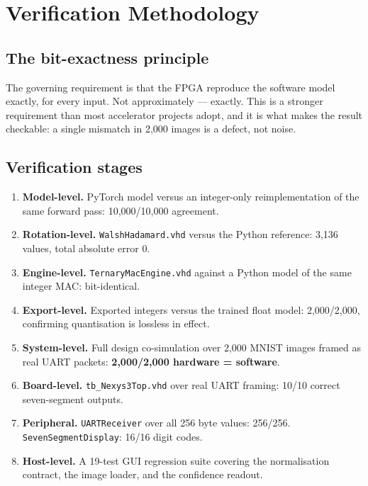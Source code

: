 \documentclass[11pt,a4paper]{article}
\begin{document}
\section{Verification Methodology}
\label{sec:verification}

\subsection{The bit-exactness principle}

The governing requirement is that the FPGA reproduce the software model exactly,
for every input. Not approximately --- exactly. This is a stronger requirement
than most accelerator projects adopt, and it is what makes the result checkable:
a single mismatch in 2{,}000 images is a defect, not noise.

\subsection{Verification stages}

\begin{enumerate}[leftmargin=*]
\item \textbf{Model-level.} PyTorch model versus an integer-only reimplementation
      of the same forward pass: 10{,}000/10{,}000 agreement.
\item \textbf{Rotation-level.} \texttt{WalshHadamard.vhd} versus the Python
      reference: 3{,}136 values, total absolute error 0.
\item \textbf{Engine-level.} \texttt{TernaryMacEngine.vhd} against a Python
      model of the same integer MAC: bit-identical.
\item \textbf{Export-level.} Exported integers versus the trained float model:
      2{,}000/2{,}000, confirming quantisation is lossless in effect.
\item \textbf{System-level.} Full design co-simulation over 2{,}000 MNIST images
      framed as real UART packets: \textbf{2{,}000/2{,}000 hardware = software}.
\item \textbf{Board-level.} \texttt{tb\_Nexys3Top.vhd} over real UART framing:
      10/10 correct seven-segment outputs.
\item \textbf{Peripheral.} \texttt{UARTReceiver} over all 256 byte values:
      256/256. \texttt{SevenSegmentDisplay}: 16/16 digit codes.
\item \textbf{Host-level.} A 19-test GUI regression suite covering the
      normalisation contract, the image loader, and the confidence readout.
\end{enumerate}
\end{document}
